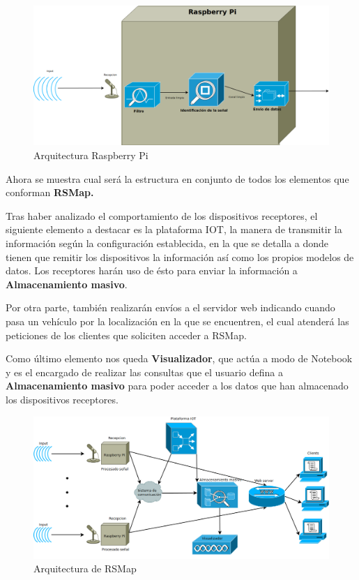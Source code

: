 \begin{figure}[!ht]
  \begin{center}
  \includegraphics[scale=0.25]{../images/diag_plan/diag_arqu_pi.png}
  \caption{Arquitectura Raspberry Pi}
  \label{fig:ar_rpi}
  \end{center}
\end{figure}

Ahora se muestra cual será la estructura en conjunto de todos los elementos que conforman \textbf{RSMap.}


Tras haber analizado el comportamiento de los dispositivos receptores, el siguiente elemento a destacar es la plataforma IOT, la manera de transmitir la información según la configuración establecida, en la que se detalla a donde tienen que remitir los dispositivos la información así como los propios modelos de datos. Los receptores harán uso de ésto para enviar la información a \textbf{Almacenamiento masivo}.

Por otra parte, también realizarán envíos a el servidor web indicando cuando pasa un vehículo por la localización en la que se encuentren, el cual atenderá las peticiones de los clientes que soliciten acceder a RSMap.

Como último elemento nos queda \textbf{Visualizador}, que actúa a modo de Notebook y es el encargado de realizar las consultas que el usuario defina a \textbf{Almacenamiento masivo} para poder acceder a los datos que han almacenado los dispositivos receptores.

\begin{figure}[!ht]
  \begin{center}
  \includegraphics[scale=0.35]{../images/diag_plan/diag_arqu.png}
  \caption{Arquitectura de RSMap}
  \label{fig:ar_rsmap}
  \end{center}
\end{figure}


